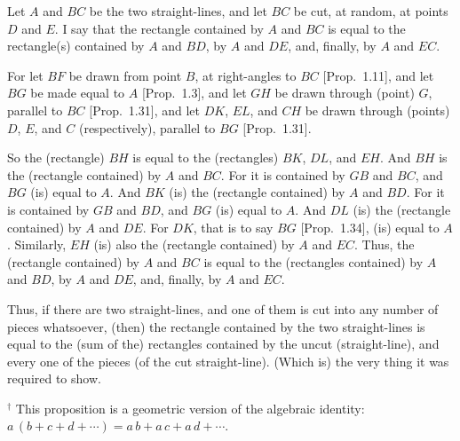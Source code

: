 \begin{Parallel}{}{}
{Let $A$ and $BC$ be the two straight-lines, and let $BC$ be cut, at random,
at points $D$ and $E$. I say that the rectangle contained by $A$ and $BC$ is equal
to the rectangle(s) contained by $A$ and $BD$, by $A$ and $DE$, and, finally, by $A$ and
$EC$.

For let $BF$ be drawn from point $B$, at right-angles to $BC$ [Prop.~1.11],
and let $BG$ be made equal to $A$ [Prop.~1.3], and let $GH$ be drawn through
(point) $G$, parallel to $BC$ [Prop.~1.31], and let $DK$, $EL$, and $CH$ be drawn through (points) $D$, $E$, and $C$ (respectively), parallel to $BG$ [Prop.~1.31].

So the (rectangle) $BH$ is equal to the (rectangles) $BK$, $DL$, and $EH$. And
$BH$ is  the (rectangle contained) by $A$ and $BC$. For it is contained by $GB$ and $BC$, and $BG$ (is) equal to $A$. And  $BK$ (is) the (rectangle contained) by $A$ and $BD$.
For it is contained by $GB$ and $BD$, and $BG$ (is) equal to $A$. And $DL$ (is) the (rectangle contained) by $A$ and $DE$.
For $DK$, that is to say $BG$ [Prop.~1.34], (is) equal to $A$. Similarly, $EH$ (is)
also the (rectangle contained) by $A$ and $EC$. Thus, the (rectangle contained) by $A$ and $BC$ is
equal to the (rectangles contained) by $A$ and $BD$,  by $A$ and $DE$, and, finally,
by $A$ and $EC$.

Thus, if there are two straight-lines, and one of them is cut into any number 
of pieces whatsoever, (then) the rectangle contained by the two straight-lines is
equal to the (sum of the) rectangles contained by the uncut (straight-line), and every one of the pieces (of the cut straight-line). (Which is) the very thing it was required to show.}
\end{Parallel}
{\footnotesize \noindent$^\dag$ This proposition is a geometric version
of the algebraic identity: $a \,(b+c+d+\cdots) = a\,b + a\,c + a\,d + \cdots$.}

